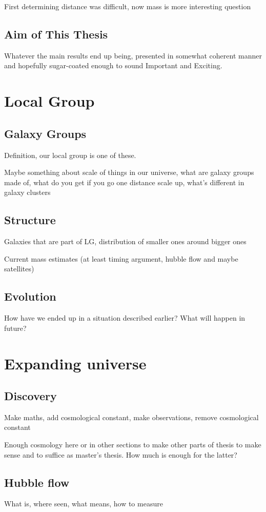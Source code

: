\documentclass[english, oneside]{HYgradu}
\begin{document}
First determining distance was difficult, now mass is more interesting question

\section{Aim of This Thesis}
Whatever the main results end up being, presented in somewhat coherent manner and hopefully sugar-coated enough to sound Important and Exciting.


\chapter{Local Group}
\section{Galaxy Groups}
Definition, our local group is one of these.

Maybe something about scale of things in our universe, what are galaxy groups made of, what do you get if you go one distance scale up, what's different in galaxy clusters

\section{Structure}
Galaxies that are part of LG, distribution of smaller ones around bigger ones

Current mass estimates (at least timing argument, hubble flow and maybe satellites)

\section{Evolution}
How have we ended up in a situation described earlier? What will happen in future?


\chapter{Expanding universe}
\section{Discovery}
Make maths, add cosmological constant, make observations, remove cosmological constant

Enough cosmology here or in other sections to make other parts of thesis to make sense and to suffice as master's thesis. How much is enough for the latter?

\section{Hubble flow}
What is, where seen, what means, how to measure
\end{document}
